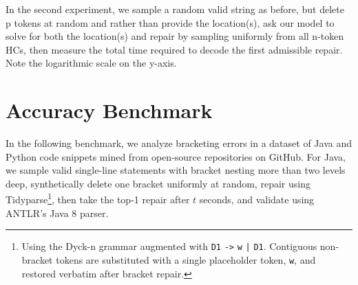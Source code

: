 \documentclass[sigplan,review,anonymous,acmsmall]{acmart}\settopmatter{printfolios=false,printccs=false,printacmref=false}
\begin{document}
\noindent In the second experiment, we sample a random valid string as before, but delete p tokens at random and rather than provide the location(s), ask our model to solve for both the location(s) and repair by sampling uniformly from all n-token HCs, then measure the total time required to decode the first admissible repair. Note the logarithmic scale on the y-axis.

\pagebreak\section{Accuracy Benchmark}

In the following benchmark, we analyze bracketing errors in a dataset of Java and Python code snippets mined from open-source repositories on GitHub. For Java, we sample valid single-line statements with bracket nesting more than two levels deep, synthetically delete one bracket uniformly at random, repair using Tidyparse\footnote{Using the Dyck-n grammar augmented with \texttt{D1} {\color{blue}\texttt{->}} \texttt{w} {\color{blue}\texttt{|}} \texttt{D1}. Contiguous non-bracket tokens are substituted with a single placeholder token, \texttt{w}, and restored verbatim after bracket repair.}, then take the top-1 repair after $t$ seconds, and validate using ANTLR's Java 8 parser.
\end{document}
